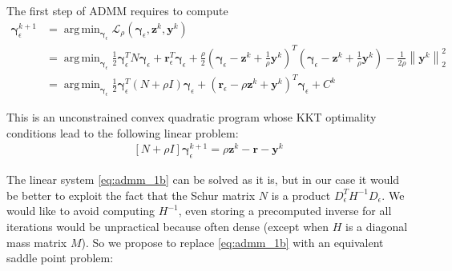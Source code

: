 \documentclass[final,3p]{elsarticle}
\newcommand{\vect}[1]{\bm{#1}}
\newcommand{\norm}[1]{\left\lVert#1\right\rVert}
\DeclareMathOperator*{\argmin}{arg\,min} %
\begin{document}
The first step of ADMM requires to compute 
\begin{align}
\vect{\gamma}_\epsilon^{k+1} &= \argmin_{\vect{\gamma}_\epsilon} \mathcal{L}_{\rho} \left( \vect{\gamma}_\epsilon,\vect{z}^k,\vect{y}^k \right) \\
 &= \argmin_{\vect{\gamma}_\epsilon} \frac{1}{2} \vect{\gamma}_\epsilon^T N \vect{\gamma}_\epsilon + \vect{r}^T_\epsilon \vect{\gamma}_\epsilon  
+ \frac{\rho}{2} (\vect{\gamma}_\epsilon - \vect{z}^k + \frac{1}{\rho} \vect{y}^k)^T(\vect{\gamma}_\epsilon - \vect{z}^k + \frac{1}{\rho} \vect{y}^k)
- \frac{1}{2\rho} \norm{\vect{y}^k}_2^2 \\
 &= \argmin_{\vect{\gamma}_\epsilon} \frac{1}{2} \vect{\gamma}_\epsilon^T (N+ \rho I) \vect{\gamma}_\epsilon 
   + (\vect{r}_\epsilon - \rho \vect{z}^k + \vect{y}^k)^T \vect{\gamma}_\epsilon + C^k 
\end{align}

This is an unconstrained convex quadratic program whose KKT optimality conditions lead to the following linear problem:
\begin{align}
    \left[ N + \rho I \right] \vect{\gamma}_\epsilon^{k+1} =  \rho \vect{z}^k - \vect{r} - \vect{y}^k
		\label{eq:admm_1b}
\end{align}


The linear system \eqref{eq:admm_1b} can be solved as it is, but in our case it would be better to exploit the fact that the Schur matrix $N$ is a product $D_\epsilon^T H^{-1} D_\epsilon$. We would like to avoid computing $H^{-1}$, even storing a precomputed inverse for all iterations would be unpractical because often dense (except when $H$ is a diagonal mass matrix $M$). So we propose to replace \eqref{eq:admm_1b} with an equivalent saddle point problem: 
\end{document}
